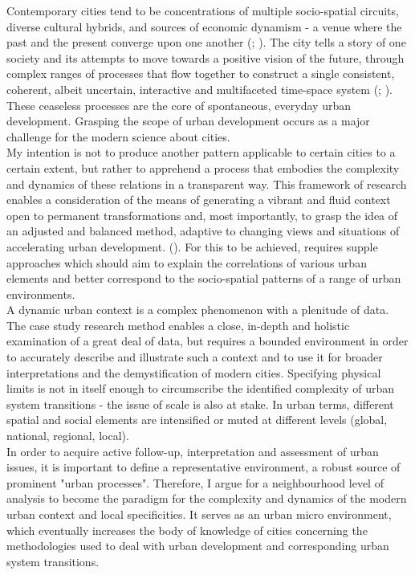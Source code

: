 \documentclass[11pt]{report}
\begin{document}
{Contemporary cities tend to be concentrations of multiple socio-spatial circuits, diverse cultural hybrids, and sources of economic dynamism - a venue where the past and the present converge upon one another (\href{ref}{\citealt{braudel_history_1970}}; \href{ref}{\citealt{harvey_condition_2003}}). The city tells a story of one society and its attempts to move towards a positive vision of the future, through complex ranges of processes that flow together to construct a single consistent, coherent, albeit uncertain, interactive and multifaceted time-space system (\href{ref}{\citealt{graham_end_1998}}; \href{ref}{\cite{graham_relational_1999}}). These ceaseless processes are the core of spontaneous, everyday urban development. Grasping the scope of urban development occurs as a major challenge for the modern science about cities.
\\

My intention is not to produce another pattern applicable to certain cities to a certain extent, but rather to apprehend a process that embodies the complexity and dynamics of these relations in a transparent way. This framework of research enables a consideration of the means of generating a vibrant and fluid context open to permanent transformations and, most importantly, to grasp the idea of an adjusted and balanced method, adaptive to changing views and situations of accelerating urban development. (\href{ref}{\citealt{portugali_complexity_2011}}). For this to be achieved, requires supple approaches which should aim to explain the correlations of various urban elements and  better correspond to the socio-spatial patterns of a range of urban environments. 
\\

A dynamic urban context is a complex phenomenon with a plenitude of data.
The case study research method enables a close, in-depth and holistic examination of a great deal of data, but requires a bounded environment in order to accurately describe and illustrate such a context and to use it for broader interpretations and the demystification of modern cities. Specifying physical limits is not in itself enough to circumscribe the identified complexity of urban system transitions - the issue of scale is also at stake. In urban terms, different spatial and social elements are intensified or muted at different levels (global, national, regional, local).
\\

In order to acquire active follow-up, interpretation and assessment of urban issues, it is important to define a representative environment, a robust source of prominent "urban processes". Therefore, I argue for a neighbourhood level of analysis to become the paradigm for the complexity and dynamics of the modern urban context and local specificities. It serves as an urban micro environment, which eventually increases the body of knowledge of cities concerning the methodologies used to deal with urban development and corresponding urban system  transitions.
\\

}
\end{document}

